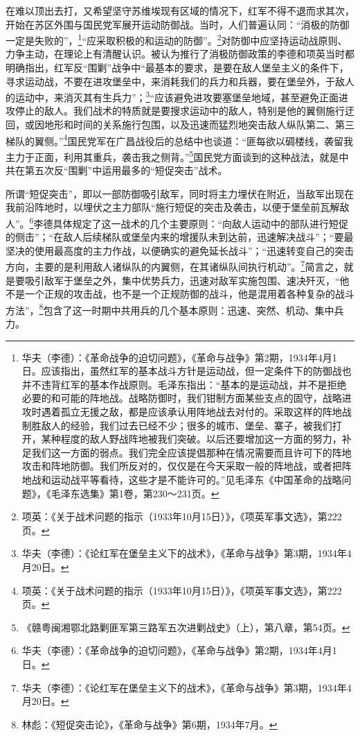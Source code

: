 在难以顶出去打，又希望坚守苏维埃现有区域的情况下，红军不得不退而求其次，开始在苏区外围与国民党军展开运动防御战。当时，人们普遍认同：“消极的防御一定是失败的”，\footnote{华夫（李德）：《革命战争的迫切问题》，《革命与战争》第2期，1934年4月1日。应该指出，虽然红军的基本战斗方针是运动战，但一定条件下的防御战也并不违背红军的基本作战原则。毛泽东指出：“基本的是运动战，并不是拒绝必要的和可能的阵地战。战略防御时，我们钳制方面某些支点的固守，战略进攻时遇着孤立无援之敌，都是应该承认用阵地战去对付的。采取这样的阵地战制胜敌人的经验，我们过去已经不少；很多的城市、堡垒、寨子，被我们打开，某种程度的敌人野战阵地被我们突破。以后还要增加这一方面的努力，补足我们这一方面的弱点。我们完全应该提倡那种在情况需要而且许可下的阵地攻击和阵地防御。我们所反对的，仅仅是在今天采取一般的阵地战，或者把阵地战和运动战平等看待，这些才是不能许可的。”见毛泽东《中国革命的战略问题》，《毛泽东选集》第1卷，第230～231页。}“应采取积极的和运动的防御”。\footnote{项英：《关于战术问题的指示（1933年10月15日）》，《项英军事文选》，第222页。}对防御中应坚持运动战原则、力争主动，在理论上有清醒认识。被认为推行了消极防御政策的李德和项英当时都明确指出，红军反“围剿”战争中“最基本的要求，是要在敌人堡垒主义的条件下，寻求运动战，不要在进攻堡垒中，来消耗我们的兵力和兵器，要在堡垒外，于敌人的运动中，来消灭其有生兵力”；\footnote{华夫（李德）：《论红军在堡垒主义下的战术》，《革命与战争》第3期，1934年4月20日。}“应该避免进攻要塞堡垒地域，甚至避免正面进攻停止的敌人。我们战术的特质就是要搜求运动中的敌人，特别是他的翼侧施行迂回，或因地形和时间的关系施行包围，以及迅速而猛烈地突击敌人纵队第二、第三梯队的翼侧。”\footnote{项英：《关于战术问题的指示（1933年10月15日）》，《项英军事文选》，第222页。}国民党军在广昌战役后的总结中也谈道：“匪每欲以碉楼线，袭留我主力于正面，利用其重兵，袭击我之侧背。”\footnote{《赣粤闽湘鄂北路剿匪军第三路军五次进剿战史》（上），第八章，第54页。}国民党方面谈到的这种战法，就是中共在第五次反“围剿”中运用最多的“短促突击”战术。


所谓“短促突击”，即以一部防御吸引敌军，同时将主力埋伏在附近，当敌军出现在我前沿阵地时，以埋伏之主力部队“施行短促的突击及袭击，以便于堡垒前瓦解敌人”。\footnote{华夫（李德）：《革命战争的迫切问题》，《革命与战争》第2期，1934年4月1日。}李德具体规定了这一战术的几个主要原则：“向敌人运动中的部队进行短促的侧击”；“在敌人后续梯队或堡垒内来的增援队未到达前，迅速解决战斗”；“要最坚决的使用最高度的主力作战，以便确实的避免延长战斗”；“迅速转变自己的突击方向，主要的是利用敌人诸纵队的内翼侧，在其诸纵队间执行机动”。\footnote{华夫（李德）：《论红军在堡垒主义下的战术》，《革命与战争》第3期，1934年4月20日。}简言之，就是要吸引敌军于堡垒之外，集中优势兵力，迅速对敌军实施包围、速决歼灭，“他不是一个正规的攻击战，也不是一个正规防御的战斗，他是混用着各种复杂的战斗方法”，\footnote{林彪：《短促突击论》，《革命与战争》第6期，1934年7月。}包含了这一时期中共用兵的几个基本原则：迅速、突然、机动、集中兵力。


